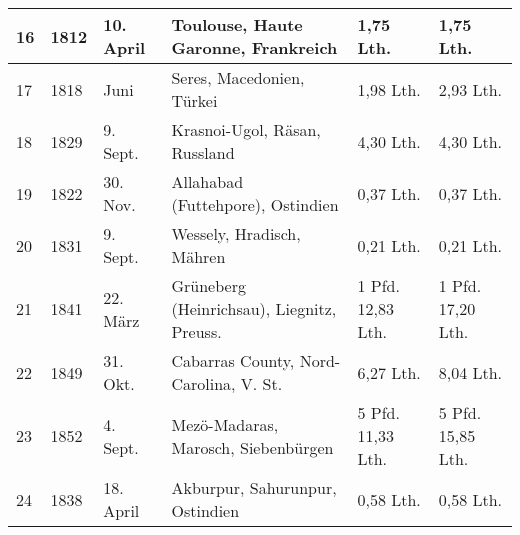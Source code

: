 \documentclass[a4paper, 11pt, oneside]{article}
\begin{document}
\begin{center}
\begin{footnotesize}
\begin{tabular}{ |p{7mm}|p{7mm}|p{13mm}|p{48mm}|p{22mm}|p{22mm}| }
    16 & 1812 & 10. April & Toulouse, Haute Garonne, Frankreich & 1,75 Lth. & 1,75 Lth.\\\hline
    17 & 1818 & Juni & Seres, Macedonien, Türkei & 1,98 Lth. & 2,93 Lth.\\\hline
    18 & 1829 & 9. Sept. & Krasnoi-Ugol, Räsan, Russland & 4,30 Lth. & 4,30 Lth.\\\hline
    19 & 1822 & 30. Nov. & Allahabad (Futtehpore), Ostindien & 0,37 Lth. & 0,37 Lth.\\\hline
    20 & 1831 & 9. Sept. & Wessely, Hradisch, Mähren & 0,21 Lth. & 0,21 Lth.\\\hline
    21 & 1841 & 22. März & Grüneberg (Heinrichsau), Liegnitz, Preuss. & 1 Pfd. 12,83 Lth. & 1 Pfd. 17,20 Lth.\\\hline
    22 & 1849 & 31. Okt. & Cabarras County, Nord-Carolina, V. St. & 6,27 Lth. & 8,04 Lth.\\\hline
    23 & 1852 & 4. Sept. & Mezö-Madaras, Marosch, Siebenbürgen & 5 Pfd. 11,33 Lth. & 5 Pfd. 15,85 Lth.\\\hline
    24 & 1838 & 18. April & Akburpur, Sahurunpur, Ostindien & 0,58 Lth. & 0,58 Lth.\\
    \hline
\end{tabular}
\end{footnotesize}
\end{center}
\end{document}
